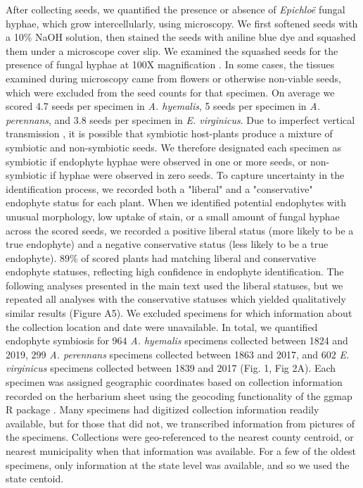 \documentclass[11pt]{article}
\begin{document}
After collecting seeds, we quantified the presence or absence of \emph{Epichloë} fungal hyphae, which grow intercellularly, using microscopy. 
We first softened seeds with a 10\% NaOH solution, then stained the seeds with aniline blue dye and squashed them under a microscope cover slip. 
We examined the squashed seeds for the presence of fungal hyphae at 100X magnification \cite{bacon2018stains}.
In some cases, the tissues examined during microscopy came from flowers or otherwise non-viable seeds, which were excluded from the seed counts for that specimen.
On average we scored 4.7 seeds per specimen in \emph{A. hyemalis}, 5 seeds per specimen in \emph{A. perennans}, and 3.8 seeds per specimen in \emph{E. virginicus}.
Due to imperfect vertical transmission \cite{afkhami2008symbiosis}, it is possible that symbiotic host-plants produce a mixture of symbiotic and non-symbiotic seeds. 
We therefore designated each specimen as symbiotic if endophyte hyphae were observed in one or more seeds, or non-symbiotic if hyphae were observed in zero seeds. 
To capture uncertainty in the identification process, we recorded both a "liberal" and a "conservative" endophyte status for each plant.  
When we identified potential endophytes with unusual morphology, low uptake of stain, or a small amount of fungal hyphae across the scored seeds, we recorded a positive liberal status (more likely to be a true endophyte) and a negative conservative status (less likely to be a true endophyte). 
$89$\% of scored plants had matching liberal and conservative endophyte statuses, reflecting high confidence in endophyte identification.
The following analyses presented in the main text used the liberal statuses, but we repeated all analyses with the conservative statuses which yielded qualitatively similar results (Figure A5). 
We excluded specimens for which information about the collection location and date were unavailable.
In total, we quantified endophyte symbiosis for $964$ \emph{A. hyemalis} specimens collected between 1824 and 2019, $299$ \emph{A. perennans} specimens collected between 1863 and 2017, and $602$ \emph{E. virginicus} specimens collected between 1839 and 2017 (Fig. 1, Fig 2A).
Each specimen was assigned geographic coordinates based on collection information recorded on the herbarium sheet using the geocoding functionality of the ggmap R package \citep{kahle2019package}.
Many specimens had digitized collection information readily available, but for those that did not, we transcribed information from pictures of the specimens. 
Collections were geo-referenced to the nearest county centroid, or nearest municipality when that information was available. 
For a few of the oldest specimens, only information at the state level was available, and so we used the state centoid.
\end{document}
